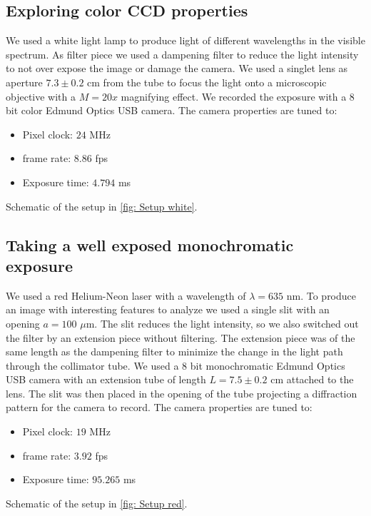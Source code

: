 \documentclass{emulateapj}
\begin{document}
\subsection{Exploring color CCD properties}
\label{subsec: Data/color CCD}
We used a white light lamp to produce light of different wavelengths in the visible spectrum. As filter piece we used a dampening filter to reduce the light intensity to not over expose the image or damage the camera. We used a singlet lens as aperture $7.3 \pm 0.2$ cm from the tube to focus the light onto a microscopic objective with a $M=20x$ magnifying effect. We recorded the exposure with a 8 bit color Edmund Optics USB camera. The camera properties are tuned to:
\begin{itemize}
\item Pixel clock: $24$ MHz
\item frame rate: $8.86$ fps
\item Exposure time: $4.794$ ms
\end{itemize}
Schematic of the setup in \cref{fig: Setup white}.
\subsection{Taking a well exposed monochromatic exposure}
\label{subsec: Data/mono CCD}
We used a red Helium-Neon laser with a wavelength of $\lambda = 635$ nm. To produce an image with interesting features to analyze we used a single slit with an opening $a = 100$ $\mu$m. The slit reduces the light intensity, so we also switched out the filter by an extension piece without filtering. The extension piece was of the same length as the dampening filter to minimize the change in the light path through the collimator tube. We used a 8 bit monochromatic Edmund Optics USB camera with an extension tube of length $L = 7.5 \pm 0.2$ cm attached to the lens. The slit was then placed in the opening of the tube projecting a diffraction pattern for the camera to record. 
The camera properties are tuned to:
\begin{itemize}
\item Pixel clock: $19$ MHz
\item frame rate: $3.92$ fps
\item Exposure time: $95.265$ ms
\end{itemize}
Schematic of the setup in \cref{fig: Setup red}.
\end{document}
